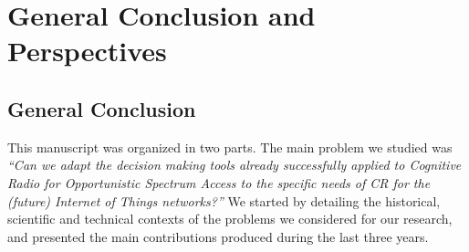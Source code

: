 
\chapter{General Conclusion and Perspectives}
\label{chapter:conclusion}

\graphicspath{{2-Chapters/6-Chapter/Images/}}



\section{General Conclusion}


This manuscript was organized in two parts.
%
The main problem we studied was \emph{``Can we adapt the decision making tools already successfully applied to Cognitive Radio for Opportunistic Spectrum Access to the specific needs of CR for the (future) Internet of Things networks?''}
%
We started by detailing the historical, scientific and technical contexts of the problems we considered for our research, and presented the main contributions produced during the last three years.


